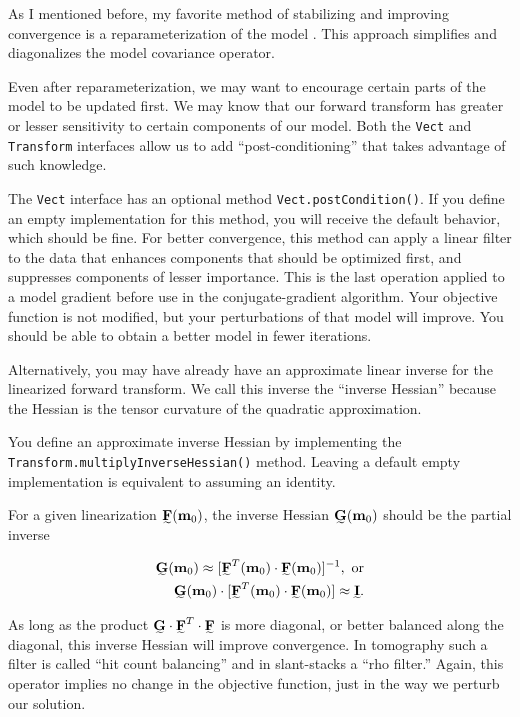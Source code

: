 \documentclass[12pt]{article}
\begin{document}
As I mentioned before, my favorite method of
stabilizing and improving convergence is a
reparameterization of the model
\cite{harlan-model}.  This approach
simplifies and diagonalizes the model
covariance operator.

Even after reparameterization, we may want to
encourage certain parts of the model to be
updated first.  We may know that our forward
transform has greater or lesser sensitivity
to certain components of our model.  Both the
\texttt{Vect} and \texttt{Transform}
interfaces allow us to add
``post-conditioning'' that takes advantage of
such knowledge.

The \texttt{Vect} interface has an optional
method \texttt{Vect\urlbr{}.postCondition()}.
If you define an empty implementation for
this method, you will receive the default
behavior, which should be fine.  For better
convergence, this method can apply a linear
filter to the data that enhances components
that should be optimized first, and
suppresses components of lesser importance.
This is the last operation applied to a model
gradient before use in the conjugate-gradient
algorithm.  Your objective function is not
modified, but your perturbations of that
model will improve.  You should be able to
obtain a better model in fewer iterations.

Alternatively, you may have already have an
approximate linear inverse for the linearized
forward transform.  We call this inverse the
``inverse Hessian'' because the Hessian is
the tensor curvature of the quadratic
approximation.  

You define an approximate inverse Hessian by implementing the 
\texttt{Transform\urlbr{}.multiply\-Inverse\-Hessian()}
method.  Leaving a default empty implementation
is equivalent to assuming an identity.

For a given linearization
$\Ftz$, the inverse Hessian $\Gt ( \mzv )$
should be the partial inverse

\begin{eqnarray}
\Gt ( \mzv ) \approx [ \FTz \cdot \Ftz ]^{-1}, ~ \mbox{or} \\
\Gt ( \mzv ) \cdot [ \FTz \cdot \Ftz] \approx {{\stensor I}}.
\end{eqnarray}

\noindent As long as the product $\Gt \cdot
\Ft^T \cdot \Ft$ is more diagonal, or better
balanced along the diagonal, this inverse
Hessian will improve convergence.  In
tomography such a filter is called ``hit
count balancing'' and in slant-stacks a ``rho
filter.'' Again, this operator implies no
change in the objective function, just in the
way we perturb our solution.
\end{document}
